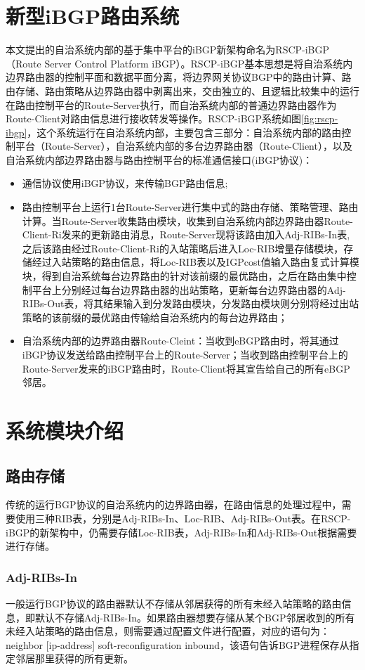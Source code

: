 \section{新型iBGP路由系统}
本文提出的自治系统内部的基于集中平台的iBGP新架构命名为RSCP-iBGP（Route Server Control Platform iBGP）。RSCP-iBGP基本思想是将自治系统内边界路由器的控制平面和数据平面分离，将边界网关协议BGP中的路由计算、路由存储、路由策略从边界路由器中剥离出来，交由独立的、且逻辑比较集中的运行在路由控制平台的Route-Server执行，而自治系统内部的普通边界路由器作为Route-Client对路由信息进行接收转发等操作。RSCP-iBGP系统如图\ref{fig:rscp-ibgp}，这个系统运行在自治系统内部，主要包含三部分：自治系统内部的路由控制平台（Route-Server），自治系统内部的多台边界路由器（Route-Client），以及自治系统内部边界路由器与路由控制平台的标准通信接口(iBGP协议)：
\begin{itemize}
  \item 通信协议使用iBGP协议，来传输BGP路由信息;
  \item 路由控制平台上运行1台Route-Server进行集中式的路由存储、策略管理、路由计算。当Route-Server收集路由模块，收集到自治系统内部边界路由器Route-Client-Ri发来的更新路由消息，Route-Server现将该路由加入Adj-RIBs-In表,之后该路由经过Route-Client-Ri的入站策略后进入Loc-RIB增量存储模块，存储经过入站策略的路由信息，将Loc-RIB表以及IGPcost值输入路由复式计算模块，得到自治系统每台边界路由的针对该前缀的最优路由，之后在路由集中控制平台上分别经过每台边界路由器的出站策略，更新每台边界路由器的Adj-RIBs-Out表，将其结果输入到分发路由模块，分发路由模块则分别将经过出站策略的该前缀的最优路由传输给自治系统内的每台边界路由；
  \item 自治系统内部的边界路由器Route-Cleint：当收到eBGP路由时，将其通过iBGP协议发送给路由控制平台上的Route-Server；当收到路由控制平台上的Route-Server发来的iBGP路由时，Route-Client将其宣告给自己的所有eBGP邻居。
\end{itemize}

\section{系统模块介绍}
\subsection{路由存储}
传统的运行BGP协议的自治系统内的边界路由器，在路由信息的处理过程中，需要使用三种RIB表，分别是Adj-RIBs-In、Loc-RIB、Adj-RIBs-Out表。在RSCP-iBGP的新架构中，仍需要存储Loc-RIB表，Adj-RIBs-In和Adj-RIBs-Out根据需要进行存储。
\subsubsection{Adj-RIBs-In}
一般运行BGP协议的路由器默认不存储从邻居获得的所有未经入站策略的路由信息，即默认不存储Adj-RIBs-In。如果路由器想要存储从某个BGP邻居收到的所有未经入站策略的路由信息，则需要通过配置文件进行配置，对应的语句为：neighbor [ip-address] soft-reconfiguration inbound，该语句告诉BGP进程保存从指定邻居那里获得的所有更新。


